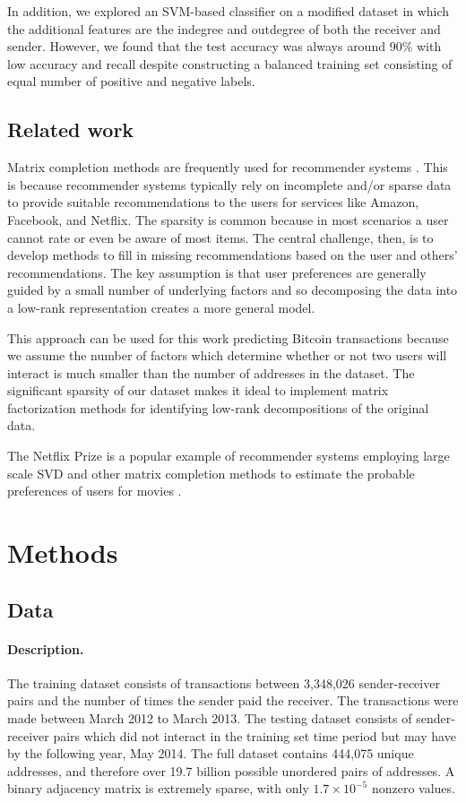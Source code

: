 \documentclass{article} %
\begin{document}
In addition, we explored an SVM-based classifier on a modified dataset in which the additional features are the indegree and outdegree of both the receiver and sender. However, we found that the test accuracy was always around 90\% with low accuracy and recall despite constructing a balanced training set consisting of equal number of positive and negative labels.

\subsection{Related work}

Matrix completion methods are frequently used for recommender systems \cite{koren2009matrix}. This is because recommender systems typically rely on incomplete and/or sparse data to provide suitable recommendations to the users for services like Amazon, Facebook, and Netflix. The sparsity is common because in most scenarios a user cannot rate or even be aware of most items. The central challenge, then, is to develop methods to fill in missing recommendations based on the user and others' recommendations. The key assumption is that user preferences are generally guided by a small number of underlying factors and so decomposing the data into a low-rank representation creates a more general model.

This approach can be used for this work predicting Bitcoin transactions because we assume the number of factors which determine whether or not two users will interact is much smaller than the number of addresses in the dataset. The significant sparsity of our dataset makes it ideal to implement matrix factorization methods for identifying low-rank decompositions of the original data.

The Netflix Prize is a popular example of recommender systems employing large scale SVD and other matrix completion methods to estimate the probable preferences of users for movies \cite{bennett2007netflix}.

\section{Methods}

\subsection{Data}

\paragraph{Description.} The training dataset consists of transactions between 3,348,026 sender-receiver pairs and the number of times the sender paid the receiver. The transactions were made between March 2012 to March 2013. The testing dataset consists of sender-receiver pairs which did not interact in the training set time period but may have by the following year, May 2014. The full dataset contains 444,075 unique addresses, and therefore over 19.7 billion possible unordered pairs of addresses. A binary adjacency matrix is extremely sparse, with only $1.7 \times 10^{-5}$ nonzero values.
\end{document}
